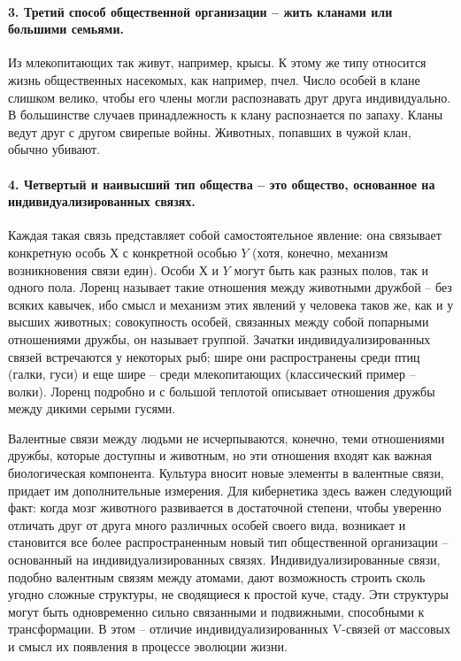 \documentclass{book}
\begin{document}
\paragraph{3. Третий способ общественной организации -- жить клана­ми  или большими семьями.} Из млекопитающих так живут, например, крысы. К этому же типу относится жизнь обществен­ных насекомых, как например, пчел. Число особей в клане слишком велико, чтобы его члены могли распознавать друг друга индивидуально. В большинстве случаев принадлежность к клану распознается по запаху. Кланы ведут друг с другом свирепые войны. Животных, попавших в чужой клан, обычно убивают.

\paragraph{4. Четвертый и наивысший тип общества -- это общество, основанное на индивидуализированных связях.} Каждая такая связь представляет собой самостоятельное явление: она связывает конкретную особь $Х$  с конкретной особью $Y$  (хотя, конечно, механизм возникновения связи един). Особи $Х$  и $Y$  могут быть как разных полов, так и одного пола. Лоренц называет такие отношения между животными дружбой -- без всяких кавычек, ибо смысл и механизм этих явлений у человека таков же, как и у высших животных; совокупность особей, связан­ных между собой попарными отношениями дружбы, он называет группой.  Зачатки индивидуализированных связей встречаются у некоторых рыб; шире они распространены среди птиц (галки, гуси) и еще шире -- среди млекопитающих (классический пример -- волки). Лоренц подробно и с большой теплотой описывает отношения дружбы между дикими серыми гусями.

Валентные связи между людьми не исчерпываются, конеч­но, теми отношениями дружбы, которые доступны и животным, но эти отношения входят как важная биологическая компонен­та. Культура вносит новые элементы в валентные связи, при­дает им дополнительные измерения. Для кибернетика здесь ва­жен следующий факт: когда мозг животного развивается в до­статочной степени, чтобы уверенно отличать друг от друга много различных особей своего вида, возникает и становится все бо­лее распространенным новый тип общественной организации -- основанный на индивидуализированных связях. Индивидуали­зированные связи, подобно валентным связям между атомами, дают возможность строить сколь угодно сложные структуры, не сводящиеся к простой куче, стаду. Эти структуры могут быть одновременно сильно связанными и подвижными, способ­ными к трансформации. В этом -- отличие индивидуализирован­ных V-связей  от массовых и смысл их появления в процессе эволюции жизни.
\end{document}
